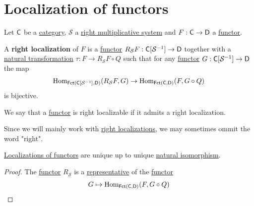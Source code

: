 \documentclass[../../main]{subfiles}
\begin{document}
\section{Localization of functors}

\begin{definition}\label{def:localization-functor}
  Let \(\mathsf{C}\) be a \hyperref[def:category]{category}, \(\mathcal{S}\) a \hyperref[def:multiplicative-system]{right multiplicative system} and \(F: \mathsf{C} \to \mathsf{D}\) a \hyperref[def:functor]{functor}.

  A \textbf{right localization} of \(F\) is a \hyperref[def:functor]{functor} \(R_{\mathcal{S}}F: \mathsf{C}[\mathcal{S}^{-1}] \to \mathsf{D}\) together with a \hyperref[def:natural-transformation]{natural transformation} \(\tau: F \to R_{\mathcal{S}}F \circ Q\) such that for any \hyperref[def:functor]{functor} \(G: \mathsf{C}[\mathcal{S}^{-1}] \to \mathsf{D}\) the map
  \begin{equation*}
    \operatorname{Hom}_{\mathsf{Fct}(\mathsf{C}[\mathcal{S}^{-1}], \mathsf{D})}(R_{\mathcal{S}}F, G) \to \operatorname{Hom}_{\mathsf{Fct}(\mathsf{C}, \mathsf{D})}(F, G \circ Q)
  \end{equation*}
  is bijective.

  We say that a \hyperref[def:functor]{functor} is right localizable if it admits a right localization.
\end{definition}

\begin{notation}
  Since we will mainly work with \hyperref[def:localization-functor]{right localizations}, we may sometimes ommit the word "right".
\end{notation}


\begin{lemma}
  \hyperref[def:localization-functor]{Localizations of functors} are unique up to unique \hyperref[def:natural-transformation]{natural isomorphism}.
\end{lemma}
\begin{proof}
  The \hyperref[def:functor]{functor} \(R_{\mathcal{S}}\) is a \hyperref[def:representable-functor]{representative} of the \hyperref[def:functor]{functor}
  \begin{equation*}
    G \mapsto \operatorname{Hom}_{\mathsf{Fct}(\mathsf{C}, \mathsf{D})}(F, G \circ Q)
  \end{equation*}
\end{proof}
\end{document}
